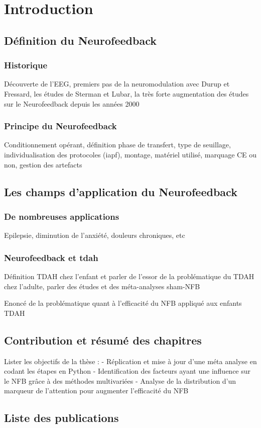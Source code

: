 \chapter{Introduction}


\section{Définition du Neurofeedback}

\subsection{Historique}
Découverte de l’EEG, premiers pas de la neuromodulation avec Durup 
et Fressard, les études de Sterman et Lubar, la très forte augmentation des études sur le Neurofeedback depuis 
les années 2000

\subsection{Principe du Neurofeedback}
Conditionnement opérant, définition phase de transfert, type de seuillage, individualisation des protocoles (iapf), 
montage, matériel utilisé, marquage CE ou non, gestion des artefacts

\section{Les champs d'application du Neurofeedback}

\subsection{De nombreuses applications}
Epilepsie, diminution de l’anxiété, douleurs chroniques, etc

\subsection{Neurofeedback et \gls{tdah}}
Définition TDAH chez l’enfant et parler de l’essor de la problématique du TDAH chez l’adulte, parler des études et des méta-analyses
sham-NFB

Enoncé de la problématique quant à l’efficacité du NFB appliqué aux enfants TDAH

\section{Contribution et résumé des chapitres}
Lister les objectifs de la thèse :
- Réplication et mise à jour d’une méta analyse en codant les étapes en Python
- Identification des facteurs ayant une influence sur le NFB grâce à des méthodes multivariées
- Analyse de la distribution d’un marqueur de l’attention pour augmenter l’efficacité du NFB

\section{Liste des publications}